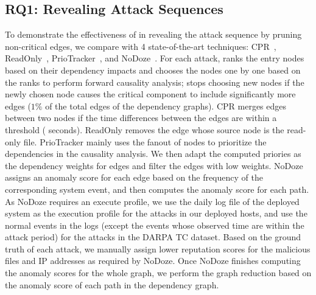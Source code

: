 



\subsection{RQ1: Revealing Attack Sequences}
\label{subsec:rq1}
To demonstrate the effectiveness of \tool in revealing the attack sequence by pruning non-critical edges, we compare \tool with 4 state-of-the-art techniques: CPR~\cite{reduction}, ReadOnly~\cite{loggc}, PrioTracker~\cite{liu2018priotracker}, and NoDoze~\cite{hassan2019nodoze}. 
For each attack, \tool ranks the entry nodes based on their dependency impacts and chooses the nodes one by one based on the ranks to perform forward causality analysis;
\tool stops choosing new nodes if the newly chosen node causes the critical component to include significantly more edges (\ie $1\%$ of the total edges of the dependency graphs).
CPR merges edges between two nodes if the time differences between the edges are within a threshold ( seconds).
ReadOnly removes the edge whose source node is the read-only file. 
PrioTracker mainly uses the fanout of nodes to prioritize the dependencies in the causality analysis. 
We then adapt the computed priories as the dependency weights for edges and filter the edges with low weights.
NoDoze assigns an anomaly score for each edge based on the frequency of the corresponding system event, and then computes the anomaly score for each path. 
As NoDoze requires an execute profile, we use the daily log file of the deployed system as the execution profile for the attacks in our deployed hosts,
and use the normal events in the logs (except the events whose observed time are within the attack period) for the attacks in the DARPA TC dataset.
Based on the ground truth of each attack, we manually assign lower reputation scores for the malicious files and IP addresses as required by NoDoze.
Once NoDoze finishes computing the anomaly scores for the whole graph, we perform the graph reduction based on the anomaly score of each path in the dependency graph. 

